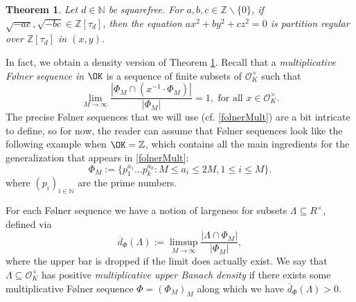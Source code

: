 \documentclass[11pt]{amsart}
\newtheorem{theorem}[lemma]{Theorem}
\theoremstyle{definition}
\newcommand{\N}{{\mathbb N}}
\newcommand{\Z}{{\mathbb Z}}
\begin{document}

 



\begin{theorem}\label{th1}
    Let  $d\in\N$ be squarefree. For $a,b,c\in\Z\backslash\{0\}$, if $\sqrt{-ac}, \sqrt{-bc}\in \Z[\tau_{d}]$, then the equation $ax^{2}+by^{2}+cz^{2}=0$ is partition regular over $\Z[\tau_{d}]$ in $(x,y)$.
\end{theorem}





In fact, we obtain a density version of Theorem \ref{th1}.
Recall that a \emph{multiplicative F\o lner sequence in} $\OK$ is a sequence of finite subsets of $\mathcal{O}_K^{\times}$ such that
\[
\lim_{M \to \infty} \frac{|\Phi_M \cap (x^{-1} \cdot \Phi_M)|}{|\Phi_M|} = 1, \text{ for all } x \in \mathcal{O}_K^{\times}.
\]
The precise F\o lner sequences that we will use (cf. \eqref{folnerMult}) are a bit intricate to define, so for now, the reader can assume that F\o lner sequences look like the following example when $\OK=\Z$, which contains all the main ingredients for the generalization that appears in \eqref{folnerMult}:
\[
\Phi_M:=\{p_1^{a_1}\dots p_k^{a_k} : M \leq a_i \leq 2M, 1 \leq i \leq M\}.
\]
where $(p_i)_{i\in \N}$ are the prime numbers. 

For each F\o lner sequence we have a notion of largeness for subsets $\Lambda \subseteq R^{\times}$, defined via
\begin{equation}\label{eq: largeness}
\overline{d}_{\Phi}(\Lambda):=\limsup_{M \to \infty} \frac{|\Lambda \cap \Phi_M|}{|\Phi_M|},
\end{equation}
where the upper bar is dropped if the limit does actually exist. We say that $\Lambda \subseteq \mathcal{O}_K^{\times}$ has positive \emph{multiplicative upper Banach density} if there exists some multiplicative F\o lner sequence $\Phi=(\Phi_M)_{M}$ along which we have $\overline{d}_{\Phi}(\Lambda)>0$. 

\end{document}
